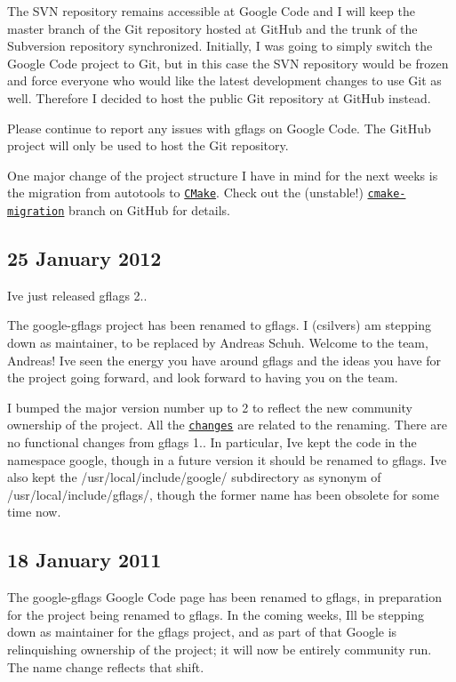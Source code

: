The S\+VN repository remains accessible at Google Code and I will keep the master branch of the Git repository hosted at Git\+Hub and the trunk of the Subversion repository synchronized. Initially, I was going to simply switch the Google Code project to Git, but in this case the S\+VN repository would be frozen and force everyone who would like the latest development changes to use Git as well. Therefore I decided to host the public Git repository at Git\+Hub instead.

Please continue to report any issues with gflags on Google Code. The Git\+Hub project will only be used to host the Git repository.

One major change of the project structure I have in mind for the next weeks is the migration from autotools to \href{http://www.cmake.org/}{\tt C\+Make}. Check out the (unstable!) \href{https://github.com/schuhschuh/gflags/tree/cmake-migration}{\tt cmake-\/migration} branch on Git\+Hub for details.

\subsection*{25 January 2012 }

I\textquotesingle{}ve just released gflags 2..

The {\ttfamily google-\/gflags} project has been renamed to {\ttfamily gflags}. I (csilvers) am stepping down as maintainer, to be replaced by Andreas Schuh. Welcome to the team, Andreas! I\textquotesingle{}ve seen the energy you have around gflags and the ideas you have for the project going forward, and look forward to having you on the team.

I bumped the major version number up to 2 to reflect the new community ownership of the project. All the \href{ChangeLog.txt}{\tt changes} are related to the renaming. There are no functional changes from gflags 1.. In particular, I\textquotesingle{}ve kept the code in the namespace {\ttfamily google}, though in a future version it should be renamed to {\ttfamily gflags}. I\textquotesingle{}ve also kept the {\ttfamily /usr/local/include/google/} subdirectory as synonym of {\ttfamily /usr/local/include/gflags/}, though the former name has been obsolete for some time now.

\subsection*{18 January 2011 }

The {\ttfamily google-\/gflags} Google Code page has been renamed to {\ttfamily gflags}, in preparation for the project being renamed to {\ttfamily gflags}. In the coming weeks, I\textquotesingle{}ll be stepping down as maintainer for the gflags project, and as part of that Google is relinquishing ownership of the project; it will now be entirely community run. The name change reflects that shift.

